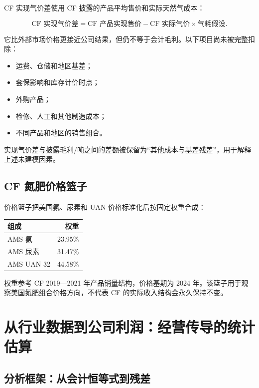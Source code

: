 \documentclass[11pt,a4paper]{ctexart}
\begin{document}
CF 实现气价差使用 CF 披露的产品平均售价和实际天然气成本：

\begin{equation*}
\text{CF 实现气价差}
=\text{CF 产品实现售价}
-\text{CF 实际气价}\times\text{气耗假设}.
\end{equation*}

它比外部市场价格更接近公司结果，但仍不等于会计毛利。以下项目尚未被完整扣除：

\begin{itemize}
  \item 运费、仓储和地区基差；
  \item 套保影响和库存计价时点；
  \item 外购产品；
  \item 检修、人工和其他制造成本；
  \item 不同产品和地区的销售组合。
\end{itemize}

实现气价差与披露毛利/吨之间的差额被保留为“其他成本与基差残差”，用于解释上述未建模因素。

\subsection{CF 氮肥价格篮子}

价格篮子把美国氨、尿素和 UAN 价格标准化后按固定权重合成：

\begin{center}
\begin{tabular}{l r}
\toprule
组成 & 权重 \\
\midrule
AMS 氨 & 23.95\% \\
AMS 尿素 & 31.47\% \\
AMS UAN 32 & 44.58\% \\
\bottomrule
\end{tabular}
\end{center}

权重参考 CF 2019---2021 年产品销量结构，价格基期为 2024 年。该篮子用于观察美国氮肥组合价格方向，不代表 CF 的实际收入结构会永久保持不变。

\section{从行业数据到公司利润：经营传导的统计估算}

\subsection{分析框架：从会计恒等式到残差}
\end{document}
